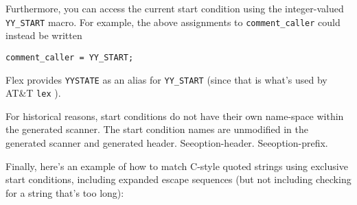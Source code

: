 \documentclass[openany,oneside]{book}
\begin{document}
Furthermore, you can access the current start condition using the
integer-valued \verb`YY_START` macro.  For example, the above
assignments to \verb`comment_caller` could instead be written


\begin{verbatim}
comment_caller = YY_START;
\end{verbatim}


Flex provides \verb`YYSTATE` as an alias for \verb`YY_START` (since that
is what's used by AT\&{}T \verb`lex` ).

For historical reasons, start conditions do not have their own
name-space within the generated scanner. The start condition names are
unmodified in the generated scanner and generated header. 
Seeoption-header. Seeoption-prefix.

Finally, here's an example of how to match C-style quoted strings using
exclusive start conditions, including expanded escape sequences (but
not including checking for a string that's too long):
\end{document}
